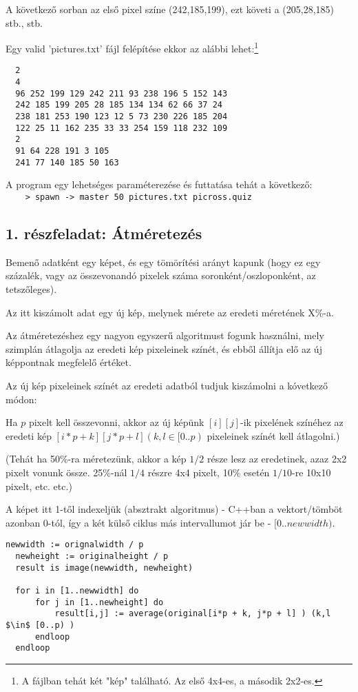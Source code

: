 \documentclass[12pt]{article}
\begin{document}
A következő sorban az első pixel színe (242,185,199), ezt követi a (205,28,185) stb., stb.

Egy valid 'pictures.txt' fájl felépítése ekkor az alábbi lehet:\footnote{A fájlban tehát két "kép" található. Az első 4x4-es, a második 2x2-es.}

\begin{verbatim}	
  2
  4
  96 252 199 129 242 211 93 238 196 5 152 143
  242 185 199 205 28 185 134 134 62 66 37 24
  238 181 253 190 123 12 5 73 230 226 185 204
  122 25 11 162 235 33 33 254 159 118 232 109
  2
  91 64 228 191 3 105
  241 77 140 185 50 163
\end{verbatim}

A program egy lehetséges paraméterezése és futtatása tehát a következő:\\
\verb|    > spawn -> master 50 pictures.txt picross.quiz|\\

\subsection{1. részfeladat: Átméretezés}

Bemenő adatként egy képet, és egy tömörítési arányt kapunk (hogy ez egy százalék, vagy az összevonandó pixelek száma soronként/oszloponként, az tetszőleges).

Az itt kiszámolt adat egy új kép, melynek mérete az eredeti méretének X\%-a.

Az átméretezéshez egy nagyon egyszerű algoritmust fogunk használni, mely szimplán átlagolja az eredeti kép pixeleinek színét, és ebből állítja elő az új képpontnak megfelelő értéket.

Az új kép pixeleinek színét az eredeti adatból tudjuk kiszámolni a kóvetkező módon:

Ha $p$ pixelt kell összevonni, akkor az új képünk $[ i ][ j ]$-ik pixelének színéhez az eredeti kép $[ i*p + k ][ j*p + l ] (k, l \in [0..p) $ pixeleinek színét kell átlagolni.)

(Tehát ha 50\%-ra méretezünk, akkor a kép $1/2$ része lesz az eredetinek, azaz 2x2 pixelt vonunk össze. 25\%-nál $1/4$ részre 4x4 pixelt, 10\% esetén $1/10$-re 10x10 pixelt, etc. etc.)

A képet itt 1-től indexeljük (absztrakt algoritmus) - C++ban a vektort/tömböt azonban 0-tól, így a két külső ciklus más intervallumot jár be - $[0..newwidth)$.\\

\begin{lstlisting}[mathescape, columns=fullflexible,  basicstyle=\ttfamily,]
  newwidth := orignalwidth / p
  newheight := originalheight / p
  result is image(newwidth, newheight)

  for i in [1..newwidth] do
      for j in [1..newheight] do
          result[i,j] := average(original[i*p + k, j*p + l] ) (k,l $\in$ [0..p) )
      endloop
  endloop
\end{lstlisting}
\end{document}
